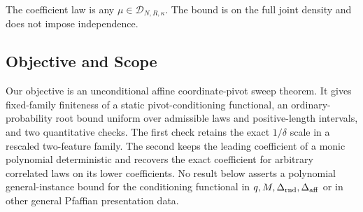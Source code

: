 \begin{assumption}
\label{assump:joint-density-cap}
The coefficient law is any $\mu\in\mathcal D_{N,R,\kappa}$.  The bound is
on the full joint density and does not impose independence.
\end{assumption}

\subsection{Objective and Scope}

Our objective is an unconditional affine coordinate-pivot sweep theorem.
It gives fixed-family finiteness of a static pivot-conditioning functional,
an ordinary-probability root bound uniform over admissible laws and
positive-length intervals, and two quantitative checks.  The first check
retains the exact $1/\delta$ scale in a rescaled two-feature family.  The
second keeps the leading coefficient of a monic polynomial deterministic
and recovers the exact coefficient for arbitrary correlated laws on its
lower coefficients.  No result below asserts a polynomial general-instance
bound for the conditioning functional in
$q,M,\Delta_{\rm rnd},\Delta_{\rm aff}$ or in other general Pfaffian
presentation data.
